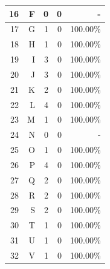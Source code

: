\begin{longtable}[c]{|r|r|r|r|r|}
	16           & F                 & 0                       & 0                       & -            \\ \hline
	17           & G                 & 1                       & 0                       &100.00\%            \\ \hline
	18           & H                 & 1                       & 0                       &100.00\%            \\ \hline
	19           & I                 & 3                       & 0                       &100.00\%            \\ \hline
	20           & J                 & 3                       & 0                       &100.00\%            \\ \hline
	21           & K                 & 2                       & 0                       &100.00\%            \\ \hline
	22           & L                 & 4                       & 0                       &100.00\%            \\ \hline
	23           & M                 & 1                       & 0                       &100.00\%            \\ \hline
	24           & N                 & 0                       & 0                       & -            \\ \hline
	25           & O                 & 1                       & 0                       &100.00\%            \\ \hline
	26           & P                 & 4                       & 0                       &100.00\%            \\ \hline
	27           & Q                 & 2                       & 0                       &100.00\%            \\ \hline
	28           & R                 & 2                       & 0                       &100.00\%            \\ \hline
	29           & S                 & 2                       & 0                       &100.00\%            \\ \hline
	30           & T                 & 1                       & 0                       &100.00\%            \\ \hline
	31           & U                 & 1                       & 0                       &100.00\%            \\ \hline
	32           & V                 & 1                       & 0                       &100.00\%            \\ \hline

\end{longtable}
